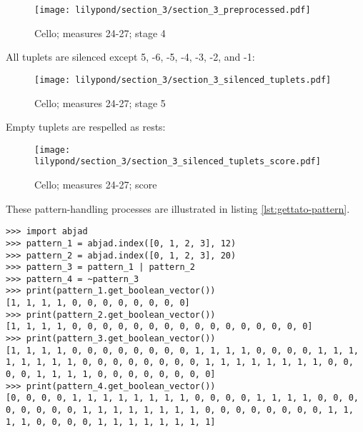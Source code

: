 
\setcounter{figure}{20}
\setcounter{subFigure}{5}
\begin{figure}[H]
    \texttt{[image: lilypond/section\_3/section\_3\_preprocessed.pdf]}
    \caption{Cello; measures 24-27; stage 4}
    \label{fig:section-3-pattern-partitioned}
\end{figure}

All tuplets are silenced except 5, -6, -5, -4, -3, -2, and -1:

\setcounter{figure}{20}
\setcounter{subFigure}{6}
\begin{figure}[H]
    \texttt{[image: lilypond/section\_3/section\_3\_silenced\_tuplets.pdf]}
    \caption{Cello; measures 24-27; stage 5}
    \label{fig:section-3-pattern-silences}
\end{figure}

Empty tuplets are respelled as rests:

\setcounter{figure}{20}
\setcounter{subFigure}{7}
\begin{figure}[H]
    \texttt{[image: lilypond/section\_3/section\_3\_silenced\_tuplets\_score.pdf]}
    \caption{Cello; measures 24-27; score}
    \label{fig:section-3-pattern-silences-score}
\end{figure}

These pattern-handling processes are illustrated in listing \ref{lst:gettato-pattern}.

\begin{lstlisting}[frame=tb,caption={Gettato attack patterns, measures 24-27},label=lst:gettato-pattern]
>>> import abjad
>>> pattern_1 = abjad.index([0, 1, 2, 3], 12)
>>> pattern_2 = abjad.index([0, 1, 2, 3], 20)
>>> pattern_3 = pattern_1 | pattern_2
>>> pattern_4 = ~pattern_3
>>> print(pattern_1.get_boolean_vector())
[1, 1, 1, 1, 0, 0, 0, 0, 0, 0, 0, 0]
>>> print(pattern_2.get_boolean_vector())
[1, 1, 1, 1, 0, 0, 0, 0, 0, 0, 0, 0, 0, 0, 0, 0, 0, 0, 0, 0]
>>> print(pattern_3.get_boolean_vector())
[1, 1, 1, 1, 0, 0, 0, 0, 0, 0, 0, 0, 1, 1, 1, 1, 0, 0, 0, 0, 1, 1, 1, 1, 1, 1, 1, 1, 0, 0, 0, 0, 0, 0, 0, 0, 1, 1, 1, 1, 1, 1, 1, 1, 0, 0, 0, 0, 1, 1, 1, 1, 0, 0, 0, 0, 0, 0, 0, 0]
>>> print(pattern_4.get_boolean_vector())
[0, 0, 0, 0, 1, 1, 1, 1, 1, 1, 1, 1, 0, 0, 0, 0, 1, 1, 1, 1, 0, 0, 0, 0, 0, 0, 0, 0, 1, 1, 1, 1, 1, 1, 1, 1, 0, 0, 0, 0, 0, 0, 0, 0, 1, 1, 1, 1, 0, 0, 0, 0, 1, 1, 1, 1, 1, 1, 1, 1]
\end{lstlisting}

